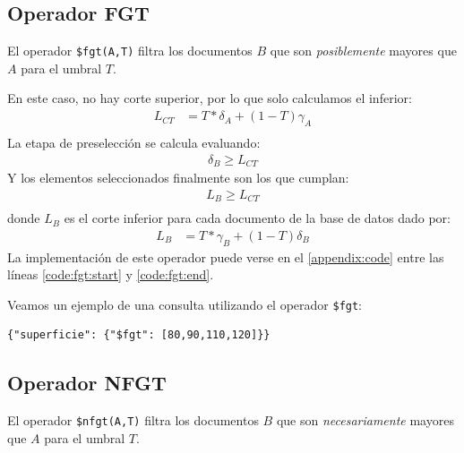 \subsection{Operador FGT}

El operador \texttt{\$fgt(A,T)} filtra los documentos $B$ que son \textit{posiblemente} mayores que $A$ para el umbral $T$.

En este caso, no hay corte superior, por lo que solo calculamos el inferior:
%
\begin{align*}
    L_{CT} &= T * \delta_A + (1-T)\gamma_A \\
\end{align*}
%
La etapa de preselección se calcula evaluando:
%
\begin{align*}
    \delta_B \geq L_{CT}
\end{align*}
%
Y los elementos seleccionados finalmente son los que cumplan:
%
\begin{align*}
    L_B \geq L_{CT} \\
\end{align*}
%
donde $L_B$ es el corte inferior para cada documento de la base de datos dado por:
%
\begin{align*}
    L_B &= T * \gamma_B + (1-T)\delta_B
\end{align*}
%
La implementación de este operador puede verse en el \autoref{appendix:code} entre las líneas \ref{code:fgt:start} y \ref{code:fgt:end}.

\begin{example}
Veamos un ejemplo de una consulta utilizando el operador \texttt{\$fgt}:
%
\begin{verbatim}
{"superficie": {"$fgt": [80,90,110,120]}}
\end{verbatim}

\end{example}

\subsection{Operador NFGT}

El operador \texttt{\$nfgt(A,T)} filtra los documentos $B$ que son \textit{necesariamente} mayores que $A$ para el umbral $T$.

